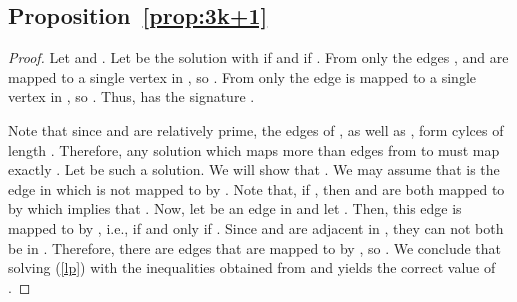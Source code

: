 \documentclass[11pt,a4paper]{article}
\begin{document}
\subsection*{Proposition~\ref{prop:3k+1}}
\begin{proof}
Let  and . 
Let  be the solution with  if  and 
if .
From  only the edges ,  and  are mapped to a single vertex in , so . From  only the edge  is mapped to a single vertex in , so .
Thus,  has the signature .



Note that since  and  are relatively prime, the edges of , 
as well as , form cylces of length .
Therefore, any solution which maps more than  edges from  to  
must map exactly .
Let  be such a solution. We will show that .
We may assume that  is the edge in  which is not
mapped to  by .
Note that, if , then  and 
are both mapped to  by  which implies that .
Now, let  be an edge in  and let
.
Then, this edge is mapped to  by , i.e.,  
if and only if
.
Since  and  are adjacent in , they can not
both be in .
Therefore, there are  edges that are mapped
to  by , so .
We conclude that solving (\ref{lp}) with the inequalities obtained from
 and  yields the correct value of .
\end{proof}
\end{document}

